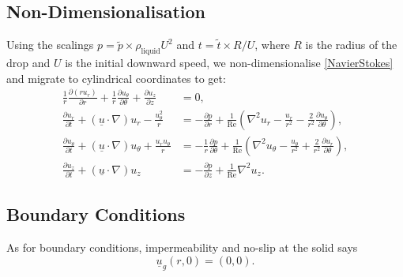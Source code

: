 \documentclass[11pt,a4paper]{article}
\begin{document}
	\subsection{Non-Dimensionalisation}
	Using the scalings $p = \tilde{p} \times \rho_\text{liquid} U^2$ and $t = \tilde{t} \times R/U$, where $R$ is the radius of the drop and $U$ is the initial downward speed, we non-dimensionalise \eqref{NavierStokes} and migrate to cylindrical coordinates to get:
	\begin{subequations}\label{NavierStokesND}
		\begin{align}
			\frac{1}{r} \frac{\partial (r u_r)}{\partial r} + \frac{1}{r} \frac{\partial u_\theta}{\partial \theta} + \frac{\partial u_z}{\partial z} &= 0, \label{NavierStokesND:continuity} \\
			\frac{\partial u_r}{\partial t} + (\underline{u} \cdot \nabla) u_r - \frac{u_\theta^2}{r} &= -\frac{\partial p}{\partial r} + \frac{1}{\text{Re}} \left( \nabla^2 u_r - \frac{u_r}{r^2} - \frac{2}{r^2} \frac{\partial u_\theta}{\partial \theta} \right), \label{NavierStokesND:r} \\
			\frac{\partial u_\theta}{\partial t} + (\underline{u} \cdot \nabla) u_\theta + \frac{u_r u_\theta}{r} &= -\frac{1}{r} \frac{\partial p}{\partial \theta} + \frac{1}{\text{Re}} \left( \nabla^2 u_\theta - \frac{u_\theta}{r^2} + \frac{2}{r^2} \frac{\partial u_r}{\partial \theta} \right), \label{NavierStokesND:theta} \\
			\frac{\partial u_z}{\partial t} + (\underline{u} \cdot \nabla) u_z &= -\frac{\partial p}{\partial z} + \frac{1}{\text{Re}} \nabla^2 u_z. \label{NavierStokesND:z}
		\end{align}
	\end{subequations}
	
	
	
	
	\subsection{Boundary Conditions}
	As for boundary conditions, impermeability and no-slip at the solid says
	\begin{equation}
		\label{BCNoSlip}
		\underline{u}_g(r,0) = (0,0).
	\end{equation}	
	
\end{document}
